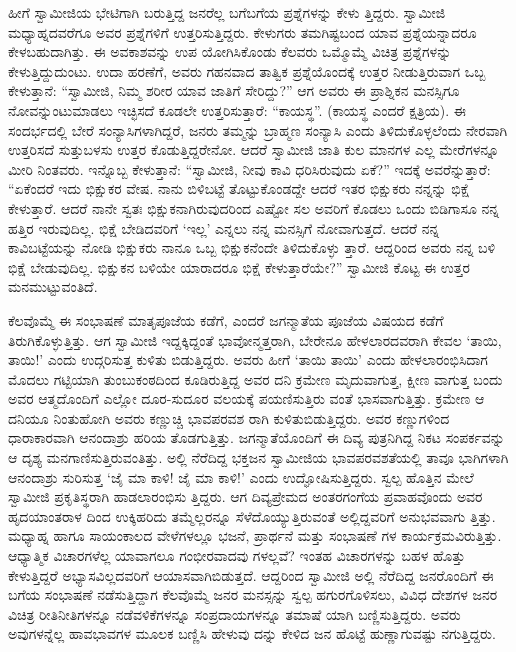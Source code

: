ಹೀಗೆ ಸ್ವಾಮೀಜಿಯ ಭೇಟಿಗಾಗಿ ಬರುತ್ತಿದ್ದ ಜನರೆಲ್ಲ ಬಗೆಬಗೆಯ ಪ್ರಶ್ನೆಗಳನ್ನು ಕೇಳು ತ್ತಿದ್ದರು. ಸ್ವಾಮೀಜಿ ಮಧ್ಯಾಹ್ನದವರೆಗೂ ಅವರ ಪ್ರಶ್ನೆಗಳಿಗೆ ಉತ್ತರಿಸುತ್ತಿದ್ದರು. ಕೇಳುಗರು ತಮಗಿಷ್ಟಬಂದ ಯಾವ ಪ್ರಶ್ನೆಯನ್ನಾದರೂ ಕೇಳಬಹುದಾಗಿತ್ತು. ಈ ಅವಕಾಶವನ್ನು ಉಪ ಯೋಗಿಸಿಕೊಂಡು ಕೆಲವರು ಒಮ್ಮೊಮ್ಮೆ ವಿಚಿತ್ರ ಪ್ರಶ್ನೆಗಳನ್ನು ಕೇಳುತ್ತಿದ್ದುದುಂಟು. ಉದಾ ಹರಣೆಗೆ, ಅವರು ಗಹನವಾದ ತಾತ್ವಿಕ ಪ್ರಶ್ನೆಯೊಂದಕ್ಕೆ ಉತ್ತರ ನೀಡುತ್ತಿರುವಾಗ ಒಬ್ಬ ಕೇಳುತ್ತಾನೆ: “ಸ್ವಾಮೀಜಿ, ನಿಮ್ಮ ಶರೀರ ಯಾವ ಜಾತಿಗೆ ಸೇರಿದ್ದು?” ಆಗ ಅವರು ಈ ಪ್ರಾಶ್ನಿಕನ ಮನಸ್ಸಿಗೂ ನೋವನ್ನುಂಟುಮಾಡಲು ಇಚ್ಛಿಸದೆ ಕೂಡಲೇ ಉತ್ತರಿಸುತ್ತಾರೆ: “ಕಾಯಸ್ಥ”. (ಕಾಯಸ್ಥ ಎಂದರೆ ಕ್ಷತ್ರಿಯ). ಈ ಸಂದರ್ಭದಲ್ಲಿ ಬೇರೆ ಸಂನ್ಯಾಸಿಗಳಾಗಿದ್ದರೆ, ಜನರು ತಮ್ಮನ್ನು ಬ್ರಾಹ್ಮಣ ಸಂನ್ಯಾಸಿ ಎಂದು ತಿಳಿದುಕೊಳ್ಳಲೆಂದು ನೇರವಾಗಿ ಉತ್ತರಿಸದೆ ಸುತ್ತುಬಳಸು ಉತ್ತರ ಕೊಡುತ್ತಿದ್ದರೇನೋ. ಆದರೆ ಸ್ವಾಮೀಜಿ ಜಾತಿ ಕುಲ ಮಾನಗಳ ಎಲ್ಲ ಮೇರೆಗಳನ್ನೂ ಮೀರಿ ನಿಂತವರು. ಇನ್ನೊಬ್ಬ ಕೇಳುತ್ತಾನೆ: “ಸ್ವಾಮೀಜಿ, ನೀವು ಕಾವಿ ಧರಿಸಿರುವುದು ಏಕೆ?” ಇದಕ್ಕೆ ಅವರೆನ್ನುತ್ತಾರೆ: “ಏಕೆಂದರೆ ಇದು ಭಿಕ್ಷುಕರ ವೇಷ. ನಾನು ಬಿಳಿಬಟ್ಟೆ ತೊಟ್ಟುಕೊಂಡದ್ದೇ ಆದರೆ ಇತರ ಭಿಕ್ಷುಕರು ನನ್ನನ್ನು ಭಿಕ್ಷೆ ಕೇಳುತ್ತಾರೆ. ಆದರೆ ನಾನೇ ಸ್ವತಃ ಭಿಕ್ಷುಕನಾಗಿರುವುದರಿಂದ ಎಷ್ಟೋ ಸಲ ಅವರಿಗೆ ಕೊಡಲು ಒಂದು ಬಿಡಿಗಾಸೂ ನನ್ನ ಹತ್ತಿರ ಇರುವುದಿಲ್ಲ. ಭಿಕ್ಷೆ ಬೇಡಿದವರಿಗೆ ‘ಇಲ್ಲ’ ಎನ್ನಲು ನನ್ನ ಮನಸ್ಸಿಗೆ ನೋವಾಗುತ್ತದೆ. ಆದರೆ ನನ್ನ ಕಾವಿಬಟ್ಟೆಯನ್ನು ನೋಡಿ ಭಿಕ್ಷುಕರು ನಾನೂ ಒಬ್ಬ ಭಿಕ್ಷುಕನೆಂದೇ ತಿಳಿದುಕೊಳ್ಳು ತ್ತಾರೆ. ಆದ್ದರಿಂದ ಅವರು ನನ್ನ ಬಳಿ ಭಿಕ್ಷೆ ಬೇಡುವುದಿಲ್ಲ. ಭಿಕ್ಷುಕನ ಬಳಿಯೇ ಯಾರಾದರೂ ಭಿಕ್ಷೆ ಕೇಳುತ್ತಾರೆಯೇ?” ಸ್ವಾಮೀಜಿ ಕೊಟ್ಟ ಈ ಉತ್ತರ ಮನಮುಟ್ಟುವಂತಿದೆ.

ಕೆಲವೊಮ್ಮೆ ಈ ಸಂಭಾಷಣೆ ಮಾತೃಪೂಜೆಯ ಕಡೆಗೆ, ಎಂದರೆ ಜಗನ್ಮಾತೆಯ ಪೂಜೆಯ ವಿಷಯದ ಕಡೆಗೆ ತಿರುಗಿಕೊಳ್ಳುತ್ತಿತ್ತು. ಆಗ ಸ್ವಾಮೀಜಿ ಇದ್ದಕ್ಕಿದ್ದಂತೆ ಭಾವೋನ್ಮತ್ತರಾಗಿ, ಬೇರೇನೂ ಹೇಳಲಾರದವರಾಗಿ ಕೇವಲ ‘ತಾಯಿ, ತಾಯಿ!’ ಎಂದು ಉದ್ಗರಿಸುತ್ತ ಕುಳಿತು ಬಿಡುತ್ತಿದ್ದರು. ಅವರು ಹೀಗೆ ‘ತಾಯಿ ತಾಯಿ’ ಎಂದು ಹೇಳಲಾರಂಭಿಸಿದಾಗ ಮೊದಲು ಗಟ್ಟಿಯಾಗಿ ತುಂಬುಕಂಠದಿಂದ ಕೂಡಿರುತ್ತಿದ್ದ ಅವರ ದನಿ ಕ್ರಮೇಣ ಮೃದುವಾಗುತ್ತ, ಕ್ಷೀಣ ವಾಗುತ್ತ ಬಂದು ಅವರ ಆತ್ಮದೊಂದಿಗೆ ಎಲ್ಲೋ ದೂರ-ಸುದೂರ ವಲಯಕ್ಕೆ ಪಯಣಿಸುತ್ತಿರು ವಂತೆ ಭಾಸವಾಗುತ್ತಿತ್ತು. ಕ್ರಮೇಣ ಆ ದನಿಯೂ ನಿಂತುಹೋಗಿ ಅವರು ಕಣ್ಣುಚ್ಚಿ ಭಾವಪರವಶ ರಾಗಿ ಕುಳಿತುಬಿಡುತ್ತಿದ್ದರು. ಅವರ ಕಣ್ಣುಗಳಿಂದ ಧಾರಾಕಾರವಾಗಿ ಆನಂದಾಶ್ರು ಹರಿಯ ತೊಡಗುತ್ತಿತ್ತು. ಜಗನ್ಮಾತೆಯೊಂದಿಗೆ ಈ ದಿವ್ಯ ಪುತ್ರನಿಗಿದ್ದ ನಿಕಟ ಸಂಪರ್ಕವನ್ನು ಆ ದೃಶ್ಯ ಮನಗಾಣಿಸುತ್ತಿರುವಂತಿತ್ತು. ಅಲ್ಲಿ ನೆರೆದಿದ್ದ ಭಕ್ತಜನ ಸ್ವಾಮೀಜಿಯ ಭಾವಪರವಶತೆಯಲ್ಲಿ ತಾವೂ ಭಾಗಿಗಳಾಗಿ ಆನಂದಾಶ್ರು ಸುರಿಸುತ್ತ ‘ಜೈ ಮಾ ಕಾಳಿ! ಜೈ ಮಾ ಕಾಳಿ!’ ಎಂದು ಉದ್ಘೋಷಿಸುತ್ತಿದ್ದರು. ಸ್ವಲ್ಪ ಹೊತ್ತಿನ ಮೇಲೆ ಸ್ವಾಮೀಜಿ ಪ್ರಕೃತಿಸ್ಥರಾಗಿ ಹಾಡಲಾರಂಭಿಸು ತ್ತಿದ್ದರು. ಆಗ ದಿವ್ಯಪ್ರೇಮದ ಅಂತರಗಂಗೆಯ ಪ್ರವಾಹವೊಂದು ಅವರ ಹೃದಯಾಂತರಾಳ ದಿಂದ ಉಕ್ಕಿಹರಿದು ತಮ್ಮೆಲ್ಲರನ್ನೂ ಸೆಳೆದೊಯ್ಯುತ್ತಿರುವಂತೆ ಅಲ್ಲಿದ್ದವರಿಗೆ ಅನುಭವವಾಗು ತ್ತಿತ್ತು. ಮಧ್ಯಾಹ್ನ ಹಾಗೂ ಸಾಯಂಕಾಲದ ವೇಳೆಗಳಲ್ಲೂ ಭಜನೆ, ಪ್ರಾರ್ಥನೆ ಮತ್ತು ಸಂಭಾಷಣೆ ಗಳ ಕಾರ್ಯಕ್ರಮವಿರುತ್ತಿತ್ತು. ಆಧ್ಯಾತ್ಮಿಕ ವಿಚಾರಗಳೆಲ್ಲ ಯಾವಾಗಲೂ ಗಂಭೀರವಾದವು ಗಳಲ್ಲವೆ? ಇಂತಹ ವಿಚಾರಗಳನ್ನು ಬಹಳ ಹೊತ್ತು ಕೇಳುತ್ತಿದ್ದರೆ ಅಭ್ಯಾಸವಿಲ್ಲದವರಿಗೆ ಆಯಾಸವಾಗಿಬಿಡುತ್ತದೆ. ಆದ್ದರಿಂದ ಸ್ವಾಮೀಜಿ ಅಲ್ಲಿ ನೆರೆದಿದ್ದ ಜನರೊಂದಿಗೆ ಈ ಬಗೆಯ ಸಂಭಾಷಣೆ ನಡೆಸುತ್ತಿದ್ದಾಗ ಕೆಲವೊಮ್ಮೆ ಜನರ ಮನಸ್ಸನ್ನು ಸ್ವಲ್ಪ ಹಗುರಗೊಳಿಸಲು, ವಿವಿಧ ದೇಶಗಳ ಜನರ ವಿಚಿತ್ರ ರೀತಿನೀತಿಗಳನ್ನೂ ನಡೆವಳಿಕೆಗಳನ್ನೂ ಸಂಪ್ರದಾಯಗಳನ್ನೂ ತಮಾಷೆ ಯಾಗಿ ಬಣ್ಣಿಸುತ್ತಿದ್ದರು. ಅವರು ಅವುಗಳನ್ನೆಲ್ಲ ಹಾವಭಾವಗಳ ಮೂಲಕ ಬಣ್ಣಿಸಿ ಹೇಳುವು ದನ್ನು ಕೇಳಿದ ಜನ ಹೊಟ್ಟೆ ಹುಣ್ಣಾಗುವಷ್ಟು ನಗುತ್ತಿದ್ದರು.

